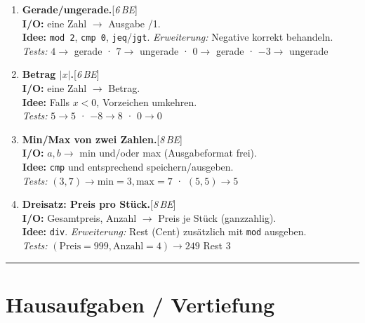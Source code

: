\documentclass[11pt,a4paper]{scrartcl}
\newenvironment{aufgaben}{%
	\begin{enumerate}[leftmargin=*,label=\textbf{Aufgabe~\arabic*:}, itemsep=0.6em]
	}{\end{enumerate}}
\newcommand{\punkte}[1]{\hfill{\small[\textit{#1\,BE}]}}%
\begin{document}
	\begin{aufgaben}
		
		\item \textbf{Gerade/ungerade.}\punkte{6}\\
		\textbf{I/O:} eine Zahl $\rightarrow$ Ausgabe /1\grqq{}.\\
		\textbf{Idee:} \texttt{mod 2}, \texttt{cmp 0}, \texttt{jeq}/\texttt{jgt}. \emph{Erweiterung:} Negative korrekt behandeln.\\
		\emph{Tests:} $4\to$ gerade \;·\; $7\to$ ungerade \;·\; $0\to$ gerade \;·\; $-3\to$ ungerade
		
		\item \textbf{Betrag $|x|$.}\punkte{6}\\
		\textbf{I/O:} eine Zahl $\rightarrow$ Betrag.\\
		\textbf{Idee:} Falls $x<0$, Vorzeichen umkehren.\\
		\emph{Tests:} $5\to 5$ \;·\; $-8\to 8$ \;·\; $0\to 0$
		
		\item \textbf{Min/Max von zwei Zahlen.}\punkte{8}\\
		\textbf{I/O:} $a,b \rightarrow$ min und/oder max (Ausgabeformat frei).\\
		\textbf{Idee:} \texttt{cmp} und entsprechend speichern/ausgeben.\\
		\emph{Tests:} $(3,7)\to \text{min}=3, \text{max}=7$ \;·\; $(5,5)\to 5$
		
		\item \textbf{Dreisatz: Preis pro Stück.}\punkte{8}\\
		\textbf{I/O:} Gesamtpreis, Anzahl $\rightarrow$ Preis je Stück (ganzzahlig).\\
		\textbf{Idee:} \texttt{div}. \emph{Erweiterung:} Rest (Cent) zusätzlich mit \texttt{mod} ausgeben.\\
		\emph{Tests:} $(\text{Preis}=999, \text{Anzahl}=4)\to 249$ Rest $3$
		
	\end{aufgaben}
	
	\vspace{0.3em}
	\hrule
	\vspace{0.6em}
	
	\section*{Hausaufgaben / Vertiefung}
	
\end{document}
